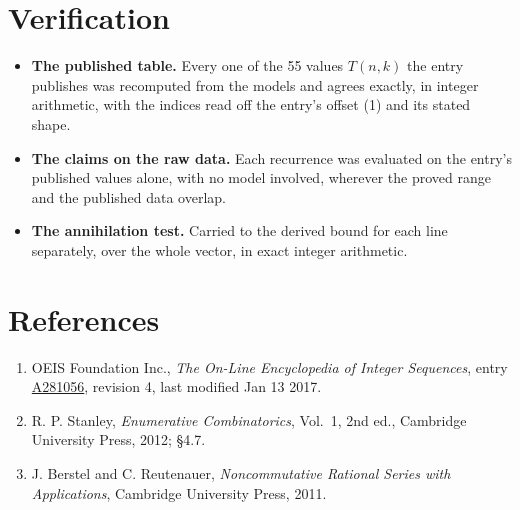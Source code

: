 \documentclass[11pt]{article}
\theoremstyle{definition}
\begin{document}
\section{Verification}

\begin{itemize}

\item {\bfseries The published table.} Every one of the 55 values $T(n,k)$ the entry publishes was recomputed from the models and agrees exactly, in integer arithmetic, with the indices read off the entry's offset (1) and its stated shape.

\item {\bfseries The claims on the raw data.} Each recurrence was evaluated on the entry's published values alone, with no model involved, wherever the proved range and the published data overlap.

\item {\bfseries The annihilation test.} Carried to the derived bound for each line separately, over the whole vector, in exact integer arithmetic.

\end{itemize}

\section{References}

\begin{enumerate}

\item OEIS Foundation Inc., \emph{The On-Line Encyclopedia of Integer Sequences}, entry \href{https://oeis.org/A281056}{A281056}, revision 4, last modified Jan 13 2017.

\item R. P. Stanley, \emph{Enumerative Combinatorics}, Vol.~1, 2nd ed., Cambridge University Press, 2012; \S4.7.

\item J. Berstel and C. Reutenauer, \emph{Noncommutative Rational Series with Applications}, Cambridge University Press, 2011.

\end{enumerate}
\end{document}
